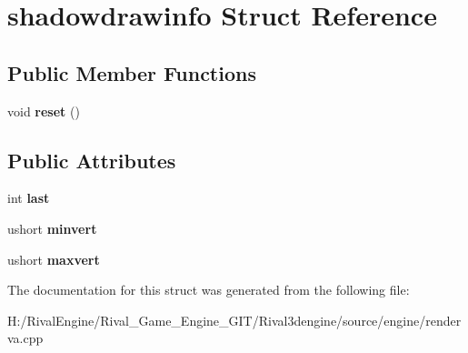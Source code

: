 \hypertarget{structshadowdrawinfo}{}\section{shadowdrawinfo Struct Reference}
\label{structshadowdrawinfo}
\subsection*{Public Member Functions}
\begin{DoxyCompactItemize}
\item 
\mbox{\label{structshadowdrawinfo_a9d471e03276dcab360c61fa25c29f502}} 
void {\bfseries reset} ()
\end{DoxyCompactItemize}
\subsection*{Public Attributes}
\begin{DoxyCompactItemize}
\item 
\mbox{\label{structshadowdrawinfo_a3a606584729a1b38c1ae87ed4490d2e2}} 
int {\bfseries last}
\item 
\mbox{\label{structshadowdrawinfo_abed59809722ea696680f34badad69646}} 
ushort {\bfseries minvert}
\item 
\mbox{\label{structshadowdrawinfo_aa5d956aa9c4eace78f70a6558af5b77e}} 
ushort {\bfseries maxvert}
\end{DoxyCompactItemize}


The documentation for this struct was generated from the following file\+:\begin{DoxyCompactItemize}
\item 
H\+:/\+Rival\+Engine/\+Rival\+\_\+\+Game\+\_\+\+Engine\+\_\+\+G\+I\+T/\+Rival3dengine/source/engine/renderva.\+cpp\end{DoxyCompactItemize}
